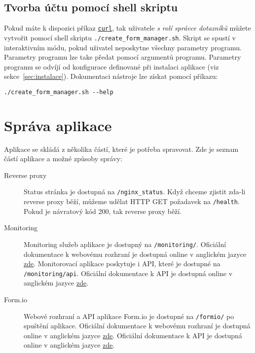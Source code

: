 \subsection{Tvorba účtu pomocí shell skriptu}\label{subsec:tvorba-uctu-pomoci-shell-skriptu}

Pokud máte k dispozici příkaz \href{https://curl.se/}{\texttt{curl}}, tak uživatele \textit{s rolí správce dotazníků} můžete vytvořit pomocí shell skriptu \texttt{./create\_form\_manager.sh}.
Skript se spustí v interaktivním módu, pokud uživatel neposkytne všechny parametry programu.
Parametry programu lze take předat pomocí argumentů programu.
Parametry programu se odvíjí od konfigurace definované při instalaci aplikace (viz sekce~\ref{sec:instalace}).
Dokumentaci nástroje lze získat pomocí příkazu:

\begin{verbatim}
./create_form_manager.sh --help
\end{verbatim}


\section{Správa aplikace}\label{sec:sprava-aplikace}

Aplikace se skládá z několika částí, které je potřeba spravovat.
Zde je seznam částí aplikace a možné způsoby správy:

\begin{description}
    \item[Reverse proxy] Status stránka je dostupná na \texttt{/nginx\_status}.
    Když chceme zjistit zda-li reverse proxy běží, můžeme udělat HTTP GET požadavek na \texttt{/health}.
    Pokud je návratový kód 200, tak reverse proxy běží.
    \item[Monitoring] Monitoring služeb aplikace je dostupný na \texttt{/monitoring/}.
    Oficiální dokumentace k webovému rozhraní je dostupná online v anglickém jazyce \href{https://github.com/google/cadvisor/blob/master/docs/web.md}{zde}.
    Monitorovací aplikace poskytuje i API, které je dostupné na \texttt{/monitoring/api}.
    Oficiální dokumentace k API je dostupná online v anglickém jazyce \href{https://github.com/google/cadvisor/blob/master/docs/api.md}{zde}.
    \item[Form.io] Webové rozhraní a API aplikace Form.io je dostupné na \texttt{/formio/} po spuštění aplikace.
    Oficiální dokumentace k webovému rozhraní je dostupná online v anglickém jazyce \href{https://help.form.io/}{zde}.
    Oficiální dokumentace k API je dostupná online v anglickém jazyce \href{https://apidocs.form.io/}{zde}.
\end{description}

